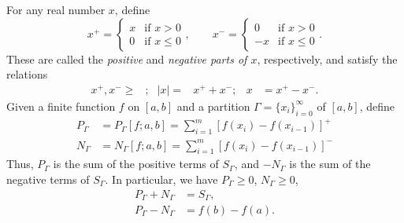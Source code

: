 For any real number $x$, define
\[
x^+=
\begin{cases}
x&\text{if $x>0$}\\
0&\text{if $x\leq 0$}
\end{cases},
\qquad
x^-=
\begin{cases}
0&\text{if $x>0$}\\
-x&\text{if $x\leq 0$}
\end{cases}.
\]
These are called the \emph{positive} and \emph{negative parts of $x$},
respectively, and satisfy the relations
\[
\begin{aligned}
x^+,x^-\geq{}&;&|x|={}&x^++x^-;&x&=x^+-x^-.
\end{aligned}
\]
Given a finite function $f$ on $[a,b]$ and a partition
$\Gamma={\{x_i\}}_{i=0}^\infty$ of $[a,b]$, define
\[
\begin{aligned}
P_\Gamma&=P_\Gamma[f;a,b]=\sum_{i=1}^m{[f(x_i)-f(x_{i-1})]}^+\\
N_\Gamma&=N_\Gamma[f;a,b]=\sum_{i=1}^m{[f(x_i)-f(x_{i-1})]}^-
\end{aligned}
\]
Thus, $P_\Gamma$ is the sum of the positive terms of $S_\Gamma$, and
$-N_\Gamma$ is the sum of the negative terms of $S_\Gamma$. In particular,
we have $P_\Gamma\geq 0$, $N_\Gamma\geq 0$,
\begin{equation}
\label{eq:p-gamma-n-gamma-sums}
\begin{aligned}
P_\Gamma+N_\Gamma&=S_\Gamma,\\
P_\Gamma-N_\Gamma&=f(b)-f(a).
\end{aligned}
\end{equation}

